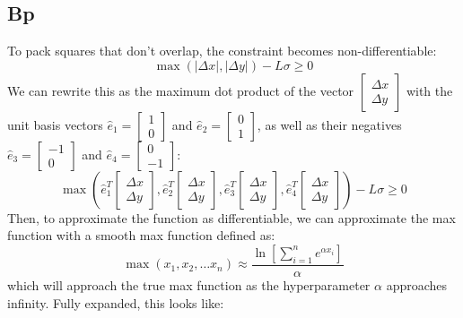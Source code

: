 \documentclass[12pt]{article}
\begin{document}
\subsection{Bp}
To pack squares that don't overlap, the constraint becomes non-differentiable:
\[
    \max(\left| \Delta x\right|, \left|\Delta y\right|) - L\sigma \geq 0
\]
We can rewrite this as the maximum dot product of the vector $\begin{bmatrix}
        \Delta x\\
        \Delta y
    \end{bmatrix}$ with the unit basis vectors $\hat e_1= \begin{bmatrix}1\\0\end{bmatrix}$ and $\hat e_2= \begin{bmatrix}0\\1\end{bmatrix}$, as well as their negatives $\hat e_3= \begin{bmatrix}-1\\0\end{bmatrix}$ and $\hat e_4= \begin{bmatrix}0\\-1\end{bmatrix}$:
\[
    \max(\hat e_1^T\begin{bmatrix}
        \Delta x\\
        \Delta y
    \end{bmatrix}, \hat e_2^T\begin{bmatrix}
        \Delta x\\
        \Delta y
    \end{bmatrix}, \hat e_3^T\begin{bmatrix}
        \Delta x\\
        \Delta y
    \end{bmatrix}, \hat e_4^T\begin{bmatrix}
        \Delta x\\
        \Delta y
    \end{bmatrix}) - L\sigma \geq 0
\]
Then, to approximate the function as differentiable, we can approximate the max function with a smooth max function defined as:
\begin{equation}\label{eq:max}
    \max(x_1,x_2,\ldots x_n) \approx \frac{\ln\left[\sum_{i=1}^{n} e^{\alpha x_i}\right]}{\alpha}
\end{equation}
which will approach the true max function as the hyperparameter $\alpha$ approaches infinity. Fully expanded, this looks like:
\end{document}
